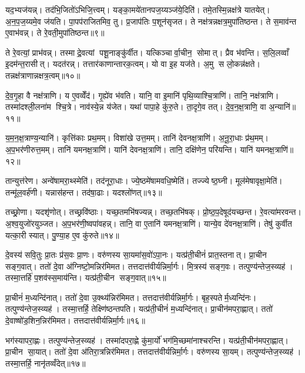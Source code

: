 यद॒भ्यज॑यन्न्। तद॑भि॒जितो॑ऽभिजि॒त्त्वम्। यङ्का॒मये॑तानपज॒य्यञ्ज॑ये॒दिति॑। तमे॒तस्मि॒न्नक्ष॑त्रे यातयेत्। अ॒न॒प॒ज॒य्यमे॒व ज॑यति। पा॒पप॑राजितमिव॒ तु। प्र॒जाप॑तिः प॒शून॑सृजत। ते नक्ष॑त्रन्नक्षत्र॒मुपा॑तिष्ठन्त। ते स॒माव॑न्त ए॒वाभ॑वन्न्। ते रे॒वती॒मुपा॑तिष्ठन्त॥९॥

ते रे॒वत्यां॒ प्राभ॑वन्न्। तस्माद्रे॒वत्यां पशू॒नाङ्कु॑र्वीत। यत्किञ्चार्वा॒चीन॒ सोमात्। प्रैव भ॑वन्ति। स॒लि॒लव्वाँ इ॒दम॑न्त॒रासीत्। यदत॑रन्न्। तत्तार॑काणान्तारक॒त्वम्। यो वा इ॒ह यज॑ते। अ॒मु स लो॒कन्न॑क्षते। तन्नक्ष॑त्राणान्नक्षत्र॒त्वम्॥१०॥

दे॒व॒गृ॒हा वै नक्ष॑त्राणि। य ए॒वव्वेँद॑। गृ॒ह्ये॑व भ॑वति। यानि॒ वा इ॒मानि॑ पृथि॒व्याश्चि॒त्राणि॑। तानि॒ नक्ष॑त्राणि। तस्मा॑दश्ली॒लना॑म श्चि॒त्रे। नाव॑स्ये॒न्न य॑जेत। यथा॑ पापा॒हे कु॑रु॒ते। ता॒दृगे॒व तत्। दे॒व॒न॒क्ष॒त्राणि॒ वा अ॒न्यानि॑॥११॥

य॒म॒न॒क्ष॒त्राण्य॒न्यानि॑। कृत्ति॑काः प्रथ॒मम्। विशा॑खे उत्त॒मम्। तानि॑ देवनक्ष॒त्राणि॑। अ॒नू॒रा॒धाः प्र॑थ॒मम्। अ॒प॒भर॑णीरुत्त॒मम्। तानि॑ यमनक्ष॒त्राणि॑। यानि॑ देवनक्ष॒त्राणि॑। तानि॒ दक्षि॑णेन॒ परि॑यन्ति। यानि॑ यमनक्ष॒त्राणि॑॥१२॥

तान्युत्त॑रेण। अन्वे॑षामरा॒थ्स्मेति॑। तद॑नूरा॒धाः। ज्ये॒ष्ठमे॑षामवधि॒ष्मेति॑। तज्ज्येष्ठ॒घ्नी। मूल॑मेषावृक्षा॒मेति॑। तन्मू॑ल॒वर्\mbox{}ह॑णी। यन्नास॑हन्त। तद॑षा॒ढाः। यदश्लो॑णत्॥१३॥

तच्छ्रो॒णा। यदशृ॑णोत्। तच्छ्रवि॑ष्ठाः। यच्छ॒तमभि॑षज्यन्न्। तच्छ॒तभि॑षक्। प्रो॒ष्ठ॒प॒देषूद॑यच्छन्त। रे॒वत्या॑मरवन्त। अ॒श्व॒युजो॑रयुञ्जत। अ॒प॒भर॑णी॒ष्वपा॑वहन्न्। तानि॒ वा ए॒तानि॑ यमनक्ष॒त्राणि॑। यान्ये॒व दे॑वनक्ष॒त्राणि॑। तेषु॑ कुर्वीत यत्का॒री स्यात्। पु॒ण्या॒ह ए॒व कु॑रुते॥१४॥

दे॒वस्य॑ सवि॒तुः प्रा॒तः प्र॑स॒वः प्रा॒णः। वरु॑णस्य सा॒यमा॑स॒वो॑ऽपा॒नः। यत्प्र॑ती॒चीनं॑ प्रात॒स्तनात्। प्रा॒चीन सङ्ग॒वात्। ततो॑ दे॒वा अ॑ग्निष्टो॒मन्निर॑मिमत। तत्तदात्त॑वीर्यन्निर्मा॒र्गः। मि॒त्रस्य॑ सङ्ग॒वः। तत्पुण्य॑न्तेज॒स्व्यह॑। तस्मा॒त्तर्\mbox{}हि॑ प॒शव॑स्स॒माय॑न्ति। यत्प्र॑ती॒चीन सङ्ग॒वात्॥१५॥

प्रा॒चीनं॑ म॒ध्यन्दि॑नात्। ततो॑ दे॒वा उ॒क्थ्य॑न्निर॑मिमत। तत्तदात्त॑वीर्यन्निर्मा॒र्गः। बृह॒स्पतेर्म॒ध्यन्दि॑नः। तत्पुण्य॑न्तेज॒स्व्यह॑। तस्मा॒त्तर्\mbox{}हि॒ तेक्ष्णि॑ष्ठन्तपति। यत्प्र॑ती॒चीनं॑ म॒ध्यन्दि॑नात्। प्रा॒चीन॑मपरा॒ह्णात्। ततो॑ दे॒वाष्षो॑ड॒शिन॒न्निर॑मिमत। तत्तदात्त॑वीर्यन्निर्मा॒र्गः॥१६॥

भग॑स्यापरा॒ह्णः। तत्पुण्य॑न्तेज॒स्व्यह॑। तस्मा॑दपरा॒ह्णे कु॑मा॒र्यो॑ भग॑मि॒च्छमा॑नाश्चरन्ति। यत्प्र॑ती॒चीन॑मपरा॒ह्णात्। प्रा॒चीन सा॒यात्। ततो॑ दे॒वा अ॑तिरा॒त्रन्निर॑मिमत। तत्तदात्त॑वीर्यन्निर्मा॒र्गः। वरु॑णस्य सा॒यम्। तत्पुण्य॑न्तेज॒स्व्यह॑। तस्मा॒त्तर्\mbox{}हि॒ नानृ॑तव्वँदेत्॥१७॥

